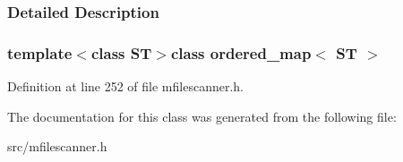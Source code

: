 \subsubsection{Detailed Description}
\subsubsection*{template$<$class S\+T$>$class ordered\+\_\+map$<$ S\+T $>$}



Definition at line 252 of file mfilescanner.\+h.



The documentation for this class was generated from the following file\+:\begin{DoxyCompactItemize}
\item 
src/mfilescanner.\+h\end{DoxyCompactItemize}
